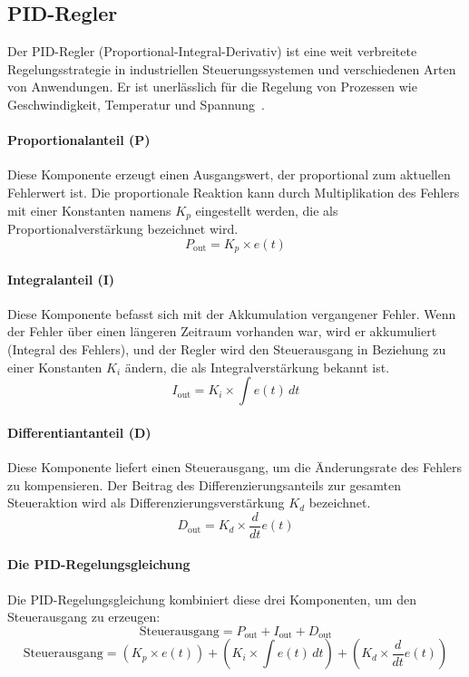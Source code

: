 \subsection{PID-Regler}
Der PID-Regler (Proportional-Integral-Derivativ) ist eine weit verbreitete Regelungsstrategie in industriellen Steuerungssystemen und verschiedenen Arten von Anwendungen. Er ist unerlässlich für die Regelung von Prozessen wie Geschwindigkeit, Temperatur und Spannung~\cite[p.~2]{Hussein2011PIDGA}.

\paragraph{Proportionalanteil (P)}
Diese Komponente erzeugt einen Ausgangswert, der proportional zum aktuellen Fehlerwert ist. Die proportionale Reaktion kann durch Multiplikation des Fehlers mit einer Konstanten namens \( K_p \) eingestellt werden, die als Proportionalverstärkung bezeichnet wird.
\begin{equation}
P_{\text{out}} = K_p \times e(t)
\end{equation}

\paragraph{Integralanteil (I)}
Diese Komponente befasst sich mit der Akkumulation vergangener Fehler. Wenn der Fehler über einen längeren Zeitraum vorhanden war, wird er akkumuliert (Integral des Fehlers), und der Regler wird den Steuerausgang in Beziehung zu einer Konstanten \( K_i \) ändern, die als Integralverstärkung bekannt ist.
\begin{equation}
I_{\text{out}} = K_i \times \int e(t) \, dt
\end{equation}

\paragraph{Differentiantanteil (D)}
Diese Komponente liefert einen Steuerausgang, um die Änderungsrate des Fehlers zu kompensieren. Der Beitrag des Differenzierungsanteils zur gesamten Steueraktion wird als Differenzierungsverstärkung \( K_d \) bezeichnet.
\begin{equation}
D_{\text{out}} = K_d \times \frac{d}{dt} e(t)
\end{equation}
\cite[p.~1744]{russell2021ai}

\paragraph{Die PID-Regelungsgleichung}
Die PID-Regelungsgleichung kombiniert diese drei Komponenten, um den Steuerausgang zu erzeugen:
\begin{equation}
\text{Steuerausgang} = P_{\text{out}} + I_{\text{out}} + D_{\text{out}}
\end{equation}
\begin{equation}
\text{Steuerausgang} = (K_p \times e(t)) + (K_i \times \int e(t) \, dt) + (K_d \times \frac{d}{dt} e(t))
\end{equation}

